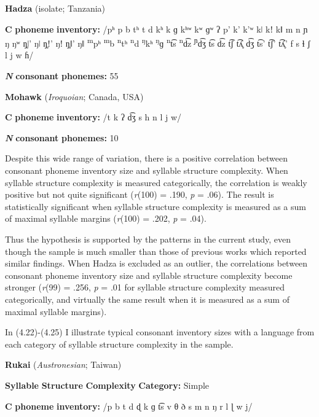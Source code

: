 \ea\label{ex:(4.20)}
   \textbf{Hadza} (isolate; Tanzania)

\textbf{C} \textbf{phoneme} \textbf{inventory:} /pʰ p b tʰ t d kʰ k ɡ kʰʷ kʷ ɡʷ ʔ p’ k’ k’ʷ kǀ kǃ kǁ m n ɲ ŋ ŋʷ ŋ̥ǀ’ ŋǀ ŋ̥ǃ’ ŋǃ ŋ̥ǁ’ ŋǁ \textsuperscript{m}pʰ \textsuperscript{m}b \textsuperscript{n}tʰ \textsuperscript{n}d \textsuperscript{ŋ}kʰ \textsuperscript{ŋ}ɡ \textsuperscript{n}t͡s \textsuperscript{n}d͡z \textsuperscript{ɲ}d͡ʒ t͡s d͡z t͡ʃ t͡ʎ̥ d͡ʒ t͡s’ t͡ʃ’ t͡ʎ̥’ f s ɬ ʃ l j w ɦ/

\textbf{\textit{N}} \textbf{consonant} \textbf{phonemes:} 55

\z

\ea\label{ex:(4.21)}
  \textbf{Mohawk} (\textit{Iroquoian}; Canada, USA)

\textbf{C} \textbf{phoneme} \textbf{inventory:} /t k ʔ d͡ʒ s h n l j w/

\textbf{\textit{N}} \textbf{consonant} \textbf{phonemes:} 10
\z

  Despite this wide range of variation, there is a positive correlation between consonant phoneme inventory size and syllable structure complexity. When syllable structure complexity is measured categorically, the correlation is weakly positive but not quite significant (\textit{r}(100) = .190, \textit{p} = .06). The result is statistically significant when syllable structure complexity is measured as a sum of maximal syllable margins (\textit{r}(100) = .202, \textit{p} = .04).

  Thus the hypothesis is supported by the patterns in the current study, even though the sample is much smaller than those of previous works which reported similar findings. When Hadza is excluded as an outlier, the correlations between consonant phoneme inventory size and syllable structure complexity become stronger (\textit{r}(99) = .256, \textit{p} = .01 for syllable structure complexity measured categorically, and virtually the same result when it is measured as a sum of maximal syllable margins).

  In (4.22)-(4.25) I illustrate typical consonant inventory sizes with a language from each category of syllable structure complexity in the sample.

\ea\label{ex:(4.22)}
  \textbf{Rukai} (\textit{Austronesian}; Taiwan)

\textbf{Syllable} \textbf{Structure} \textbf{Complexity} \textbf{Category:} Simple

\textbf{C} \textbf{phoneme} \textbf{inventory:} /p b t d ɖ k ɡ t͡s v θ ð s m n ŋ r l ɭ w j/

